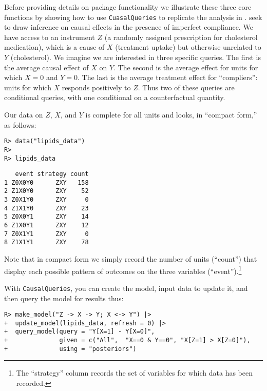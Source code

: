 \documentclass[
  11pt,
  article]{jss}
\begin{document}
Before providing details on package functionality we illustrate these
three core functions by showing how to use \texttt{CuasalQueries} to
replicate the analysis in
\citetext{\citealp{chickering_clinicians_1996}; \citealp[see
also][]{humphreys_integrated_2023}}. \citet{chickering_clinicians_1996}
seek to draw inference on causal effects in the presence of imperfect
compliance. We have access to an instrument \(Z\) (a randomly assigned
prescription for cholesterol medication), which is a cause of \(X\)
(treatment uptake) but otherwise unrelated to \(Y\) (cholesterol). We
imagine we are interested in three specific queries. The first is the
average causal effect of \(X\) on \(Y\). The second is the average
effect for units for which \(X=0\) and \(Y=0\). The last is the average
treatment effect for ``compliers'': units for which \(X\) responds
positively to \(Z\). Thus two of these queries are conditional queries,
with one conditional on a counterfactual quantity.

Our data on \(Z\), \(X\), and \(Y\) is complete for all units and looks,
in ``compact form,'' as follows:

\begin{verbatim}
R> data("lipids_data")
R> 
R> lipids_data
\end{verbatim}

\begin{verbatim}
   event strategy count
1 Z0X0Y0      ZXY   158
2 Z1X0Y0      ZXY    52
3 Z0X1Y0      ZXY     0
4 Z1X1Y0      ZXY    23
5 Z0X0Y1      ZXY    14
6 Z1X0Y1      ZXY    12
7 Z0X1Y1      ZXY     0
8 Z1X1Y1      ZXY    78
\end{verbatim}

Note that in compact form we simply record the number of units
(``count'') that display each possible pattern of outcomes on the three
variables (``event'').\footnote{The ``strategy'' column records the set
  of variables for which data has been recorded.}

With \texttt{CausalQueries}, you can create the model, input data to
update it, and then query the model for results thus:

\begin{verbatim}
R> make_model("Z -> X -> Y; X <-> Y") |>
+  update_model(lipids_data, refresh = 0) |>
+  query_model(query = "Y[X=1] - Y[X=0]",
+              given = c("All",  "X==0 & Y==0", "X[Z=1] > X[Z=0]"),
+              using = "posteriors") 
\end{verbatim}
\end{document}
